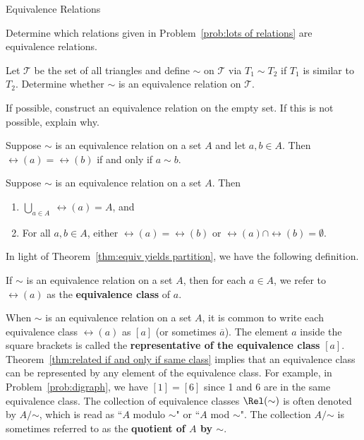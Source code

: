\begin{section}{Equivalence Relations}
\begin{problem}\label{prob:equiv from lots of relations}
Determine which relations given in Problem~\ref{prob:lots of relations} are equivalence relations.
\end{problem}

\begin{problem}
Let $\mathcal{T}$ be the set of all triangles and define $\sim$ on $\mathcal{T}$ via $T_1\sim T_2$ if $T_1$ is similar to $T_2$.  Determine whether $\sim$ is an equivalence relation on $\mathcal{T}$.
\end{problem}

\begin{problem}
If possible, construct an equivalence relation on the empty set.  If this is not possible, explain why.
\end{problem}

\begin{theorem}\label{thm:related if and only if same class}
Suppose $\sim$ is an equivalence relation on a set $A$ and let $a,b\in A$.  Then $\rel(a)=\rel(b)$ if and only if $a\sim b$.
\end{theorem}

\begin{theorem}\label{thm:equiv yields partition}
Suppose $\sim$ is an equivalence relation on a set $A$.  Then
\begin{enumerate}[label=\textrm{(\alph*)}]
\item $\displaystyle \bigcup_{a\in A}\ \rel(a)=A$, and
\item\label{thm:equiv yields partition b} For all $a,b\in A$, either $\rel(a)=\rel(b)$ or $\rel(a)\cap \rel(b)=\emptyset$.
\end{enumerate}
\end{theorem}

In light of Theorem~\ref{thm:equiv yields partition}, we have the following definition.

\begin{definition}\label{def:equivalence class}
If $\sim$ is an equivalence relation on a set $A$, then for each $a\in A$, we refer to $\rel(a)$ as the \textbf{equivalence class} of $a$.
\end{definition}

When $\sim$ is an equivalence relation on a set $A$, it is common to write each equivalence class $\rel(a)$ as $\boxed{[a]}$ (or sometimes $\overline{a}$). The element $a$ inside the square brackets is called the \textbf{representative of the equivalence class} $[a]$.  Theorem~\ref{thm:related if and only if same class} implies that an equivalence class can be represented by any element of the equivalence class.  For example, in Problem~\ref{prob:digraph}, we have $[1]=[6]$ since 1 and 6 are in the same equivalence class. The collection of equivalence classes $\Rel(\sim)$ is often denoted by $\boxed{A/\mathord\sim}$, which is read as ``$A$ modulo $\sim$" or ``$A$ mod $\sim$".  The collection $A/\mathord\sim$ is sometimes referred to as the \textbf{quotient of $A$ by $\sim$}.


\end{section}
